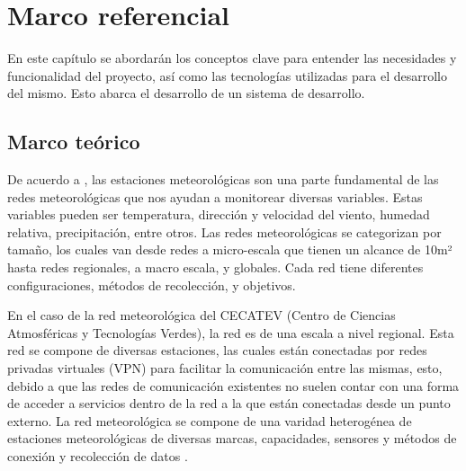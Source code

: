 \chapter{Marco referencial}


En este capítulo se abordarán los conceptos clave para entender las necesidades y funcionalidad del proyecto, así como las tecnologías utilizadas para el desarrollo del mismo. Esto abarca el desarrollo de un sistema de desarrollo.

\section{Marco teórico}


De acuerdo a \cite{muller_sensors_and_the_city}, las estaciones meteorológicas son una parte fundamental de las redes meteorológicas que nos ayudan a monitorear diversas variables. Estas variables pueden ser temperatura, dirección y velocidad del viento, humedad relativa, precipitación, entre otros. Las redes meteorológicas se categorizan por tamaño, los cuales van desde redes a micro-escala que tienen un alcance de 10m² hasta redes regionales, a macro escala, y globales. Cada red tiene diferentes configuraciones, métodos de recolección, y objetivos.

En el caso de la red meteorológica del CECATEV (Centro de Ciencias Atmosféricas y Tecnologías Verdes), la red es de una escala a nivel regional. Esta red se compone de diversas estaciones, las cuales están conectadas por redes privadas virtuales (VPN) para facilitar la comunicación entre las mismas, esto, debido a que las redes de comunicación existentes no suelen contar con una forma de acceder a servicios dentro de la red a la que están conectadas desde un punto externo. La red meteorológica se compone de una varidad heterogénea de estaciones meteorológicas de diversas marcas, capacidades, sensores y métodos de conexión y recolección de datos \cite{red_climatologica_uacj}.


